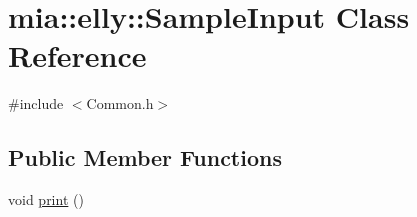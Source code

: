 \hypertarget{classmia_1_1elly_1_1_sample_input}{\section{mia\-:\-:elly\-:\-:Sample\-Input Class Reference}
\label{classmia_1_1elly_1_1_sample_input}
}


{\ttfamily \#include $<$Common.\-h$>$}

\subsection*{Public Member Functions}
\begin{DoxyCompactItemize}
\item 
void \hyperlink{classmia_1_1elly_1_1_sample_input_a4fe98adcf51c0ca80984a5abf8233d1d}{print} ()
\end{DoxyCompactItemize}
